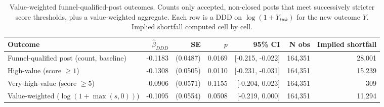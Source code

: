\begin{table}[ht]
\centering
\caption{Value-weighted funnel-qualified-post outcomes. Counts only accepted, non-closed posts that meet successively stricter score thresholds, plus a value-weighted aggregate. Each row is a DDD on $\log(1+Y_{twk})$ for the new outcome $Y$. Implied shortfall computed cell by cell.}
\label{tab:value_weighted_funnel}
\small \setlength{\tabcolsep}{4pt}
\begin{adjustbox}{max width=\textwidth}
\begin{tabular}{lrrrrrr}
\toprule
Outcome & $\hat\beta_{DDD}$ & SE & $p$ & 95\% CI & N obs & Implied shortfall \\
\midrule
Funnel-qualified post (count, baseline) & -0.1183 & (0.0487) & 0.0169 & [-0.215, -0.022] & 164,351 & 28,001 \\
High-value (score $\geq 1$) & -0.1308 & (0.0505) & 0.0110 & [-0.231, -0.031] & 164,351 & 15,239 \\
Very-high-value (score $\geq 5$) & -0.0906 & (0.0571) & 0.1155 & [-0.204, 0.023] & 164,351 & 309 \\
Value-weighted ($\log(1+\max(s,0))$) & -0.1095 & (0.0554) & 0.0508 & [-0.219, 0.000] & 164,351 & 11,294 \\
\bottomrule
\end{tabular}
\end{adjustbox}
\end{table}
